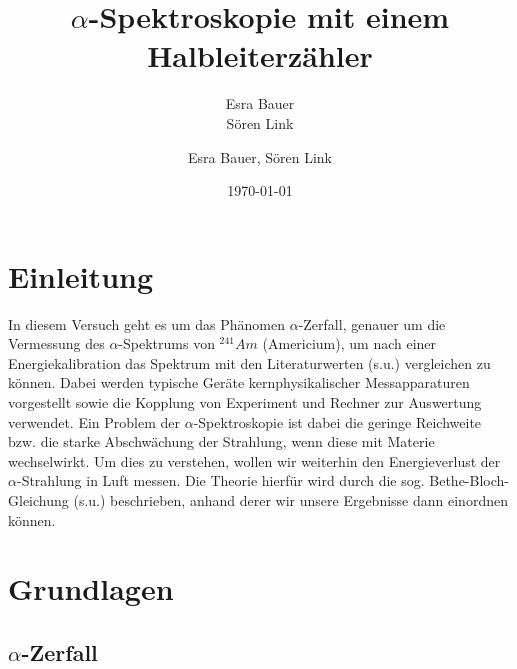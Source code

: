 \documentclass[bigchapter,colorback,accentcolor=tud4b,linedtoc,11pt]{tudreport}
\title{$\alpha$-Spektroskopie mit einem Halbleiterzähler}
\subtitle{Esra Bauer \\Sören Link}
\author{Esra Bauer, Sören Link}
\date{\today}
\begin{document}

\maketitle

\tableofcontents


\chapter{Einleitung}

In diesem Versuch geht es um das Phänomen $\alpha$-Zerfall, genauer um die Vermessung des $\alpha$-Spektrums von $^{241}Am$ (Americium), um nach einer Energiekalibration das Spektrum mit den Literaturwerten (s.u.) vergleichen zu können. Dabei werden typische Geräte kernphysikalischer Messapparaturen vorgestellt sowie die Kopplung von Experiment und Rechner zur Auswertung verwendet. Ein Problem der $\alpha$-Spektroskopie ist dabei die geringe Reichweite bzw. die starke Abschwächung der Strahlung, wenn diese mit Materie wechselwirkt. Um dies zu verstehen, wollen wir weiterhin den Energieverlust der $\alpha$-Strahlung in Luft messen. Die Theorie hierfür wird durch die sog. Bethe-Bloch-Gleichung (s.u.) beschrieben, anhand derer wir unsere Ergebnisse dann einordnen können.

\chapter{Grundlagen}

\section{$\alpha$-Zerfall}
\end{document}
